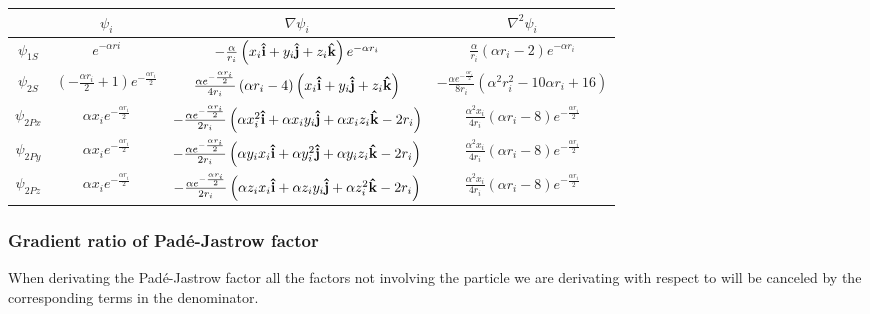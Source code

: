 \documentclass[x11names]{article}
\begin{document}
			\begin{center}
				\begin{tabular}{| c | c | c | c |}
				\bottomrule
				& \( \psi_i\)	& \( \nabla\psi_i \) & \( \nabla^2\psi_i \)
				\\ \hline
					\(\psi_{1S}\)
					&
					\( e^{- \alpha ri} \)
					&
					\( - \frac{\alpha}{r_{i}} \left(x_{i}\vu{i} + y_{i}\vu{j} + z_{i}\vu{k}\right) e^{- \alpha r_{i}} \)
					&
					\(\frac{\alpha}{r_{i}} \left(\alpha r_{i} - 2\right) e^{- \alpha r_{i}} \)
				\\	\hline
					\(\psi_{2S}\)
					&
					\( \left(- \frac{\alpha r_{i}}{2} + 1\right) e^{- \frac{\alpha r_{i}}{2}} \)
					&
					\( \frac{\alpha e^{- \frac{\alpha r_{i}}{2}}}{4 r_{i}} \left(\alpha r_{i} - 4\right) \left(x_{i}\vu{i} + y_{i}\vu{j} + z_{i}\vu{k}\right) \)
					&
					\( - \frac{\alpha e^{- \frac{\alpha r_{i}}{2}}}{8 r_{i}} \left(\alpha^{2} r_{i}^{2} - 10 \alpha r_{i} + 16\right) \)
				\\	\hline
					\(\psi_{2Px}\)
					&
					\( \alpha x_{i} e^{- \frac{\alpha r_{i}}{2}} \)
					&
					\( - \frac{\alpha e^{- \frac{\alpha r_{i}}{2}}}{2 r_{i}} \left(\alpha x_{i}^{2}\vu{i} + \alpha x_{i} y_{i}\vu{j} + \alpha x_{i} z_{i}\vu{k} - 2 r_{i}\right) \)
					&
					\( \frac{\alpha^{2} x_{i}}{4 r_{i}} \left(\alpha r_{i} - 8\right) e^{- \frac{\alpha r_{i}}{2}} \)
				\\	\hline
					\(\psi_{2Py}\)
					&
					\( \alpha x_{i} e^{- \frac{\alpha r_{i}}{2}} \)
					&
					\( - \frac{\alpha e^{- \frac{\alpha r_{i}}{2}}}{2 r_{i}} \left(\alpha y_{i} x_{i}\vu{i} + \alpha y_{i}^{2}\vu{j} + \alpha y_{i} z_{i}\vu{k} - 2 r_{i}\right) \)
					&
					\( \frac{\alpha^{2} x_{i}}{4 r_{i}} \left(\alpha r_{i} - 8\right) e^{- \frac{\alpha r_{i}}{2}} \)
				\\	\hline
					\(\psi_{2Pz}\)
					&
					\( \alpha x_{i} e^{- \frac{\alpha r_{i}}{2}} \)
					&
					\( - \frac{\alpha e^{- \frac{\alpha r_{i}}{2}}}{2 r_{i}} \left(\alpha z_{i} x_{i}\vu{i} + \alpha z_{i} y_{i}\vu{j} + \alpha z_{i}^{2}\vu{k} - 2 r_{i}\right) \)
					&
					\( \frac{\alpha^{2} x_{i}}{4 r_{i}} \left(\alpha r_{i} - 8\right) e^{- \frac{\alpha r_{i}}{2}} \)
				\\ \toprule
				\end{tabular}
			\end{center}

		\subsubsection{Gradient ratio of  Padé-Jastrow factor }
			When derivating the Padé-Jastrow factor all the factors not involving the particle we are derivating with respect to will be canceled by the corresponding terms in the denominator.
\end{document}
